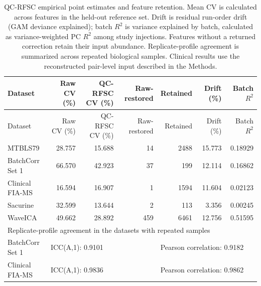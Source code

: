 \footnotesize
\begin{longtable}{lrrrrrr}
\caption{QC-RFSC empirical point estimates and feature retention. Mean CV is calculated across features in the held-out reference set. Drift is residual run-order drift (GAM deviance explained); batch $R^2$ is variance explained by batch, calculated as variance-weighted PC $R^2$ among study injections. Features without a returned correction retain their input abundance. Replicate-profile agreement is summarized across repeated biological samples. Clinical results use the reconstructed pair-level input described in the Methods.}\label{tab:supp_qcrfsc_empirical}\\
\toprule
Dataset & Raw CV (\%) & QC-RFSC CV (\%) & Raw-restored & Retained & Drift (\%) & Batch $R^2$ \\
\midrule
\endfirsthead
\toprule
Dataset & Raw CV (\%) & QC-RFSC CV (\%) & Raw-restored & Retained & Drift (\%) & Batch $R^2$ \\
\midrule
\endhead
\bottomrule
\endlastfoot
MTBLS79 & 28.757 & 15.688 & 14 & 2488 & 15.773 & 0.18929 \\
BatchCorr Set 1 & 66.570 & 42.923 & 37 & 199 & 12.114 & 0.16862 \\
Clinical FIA-MS & 16.594 & 16.907 & 1 & 1594 & 11.604 & 0.02123 \\
Sacurine & 32.599 & 13.644 & 2 & 113 & 3.356 & 0.00245 \\
WaveICA & 49.662 & 28.892 & 459 & 6461 & 12.756 & 0.51595 \\
\midrule
\multicolumn{7}{l}{Replicate-profile agreement in the datasets with repeated samples} \\
BatchCorr Set 1 & \multicolumn{3}{l}{ICC(A,1): 0.9101} & \multicolumn{3}{l}{Pearson correlation: 0.9182} \\
Clinical FIA-MS & \multicolumn{3}{l}{ICC(A,1): 0.9836} & \multicolumn{3}{l}{Pearson correlation: 0.9862} \\
\end{longtable}
